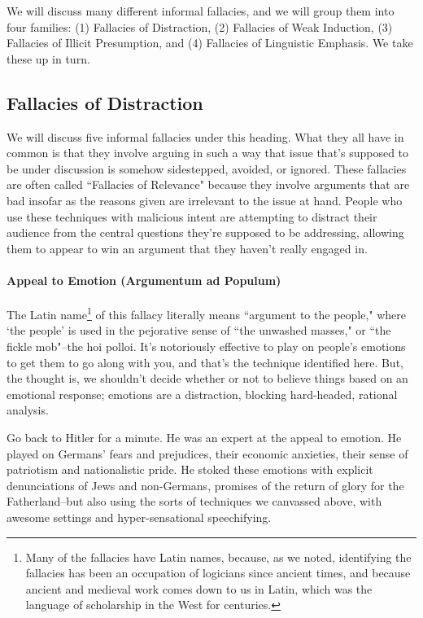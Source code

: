 We will discuss many different informal fallacies, and we will group them into four families: (1)
Fallacies of Distraction, (2) Fallacies of Weak Induction, (3) Fallacies of Illicit Presumption, and
(4) Fallacies of Linguistic Emphasis. We take these up in turn.

\subsection{Fallacies of Distraction}
We will discuss five informal fallacies under this heading. What they all have in common is that
they involve arguing in such a way that issue that's supposed to be under discussion is somehow
sidestepped, avoided, or ignored. These fallacies are often called ``Fallacies of Relevance" because
they involve arguments that are bad insofar as the reasons given are irrelevant to the issue at hand.
People who use these techniques with malicious intent are attempting to distract their audience
from the central questions they're supposed to be addressing, allowing them to appear to win an
argument that they haven't really engaged in.

\paragraph{Appeal to Emotion (Argumentum ad Populum)}


The Latin name\footnote{Many of the fallacies have 
Latin names, because, as we noted, identifying the fallacies has been an occupation of
logicians since ancient times, and because ancient and medieval work comes down to us in Latin, which was the
language of scholarship in the West for centuries.}
of this fallacy literally means ``argument to the people," where `the people' is used
in the pejorative sense of ``the unwashed masses," or ``the fickle mob"--the hoi polloi. It's
notoriously effective to play on people's emotions to get them to go along with you, and that's the
technique identified here. But, the thought is, we shouldn't decide whether or not to believe things
based on an emotional response; emotions are a distraction, blocking hard-headed, rational
analysis.

Go back to Hitler for a minute. He was an expert at the appeal to emotion. He played on Germans'
fears and prejudices, their economic anxieties, their sense of patriotism and nationalistic pride. He
stoked these emotions with explicit denunciations of Jews and non-Germans, promises of the
return of glory for the Fatherland--but also using the sorts of techniques we canvassed above, with
awesome settings and hyper-sensational speechifying.

